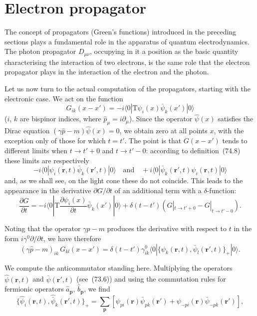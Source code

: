 \section{Electron propagator}

The concept of propagators (Green's functions) introduced in the preceding sections plays a fundamental role in the apparatus of quantum electrodynamics. The photon propagator $D_{\mu\nu}$, occupying in it a position as the basic quantity characterising the interaction of two electrons, is the same role that the electron propagator plays in the interaction of the electron and the photon.

Let us now turn to the actual computation of the propagators, starting with the electronic case. We act on the function
\begin{equation}
G_{ik}(x - x') = -i\langle 0|\mathrm{T}\psi_i(x)\bar{\psi}_k(x')|0\rangle
\tag{75.1}
\label{eq:75.1}
\end{equation}
($i$, $k$ are bispinor indices, where $\hat{p}_\mu = i\partial_\mu$). Since the operator $\hat{\psi}(x)$ satisfies the Dirac equation $(\gamma\hat{p} - m)\hat{\psi}(x) = 0$, we obtain zero at all points $x$, with the exception only of those for which $t = t'$. The point is that $G(x - x')$ tends to different limits when $t \to t' + 0$ and $t \to t' - 0$: according to definition~(74.8) these limits are respectively
\[
-i\langle 0|\psi_i(\mathbf{r},t)\bar{\psi}_k(\mathbf{r}',t)|0\rangle\quad\text{and}\quad +i\langle 0|\bar{\psi}_k(\mathbf{r}',t)\psi_i(\mathbf{r},t)|0\rangle
\]
and, as we shall see, on the light cone these do not coincide. This leads to the appearance in the derivative $\partial G/\partial t$ of an additional term with a $\delta$-function:
\begin{equation}
\frac{\partial G}{\partial t} = -i\langle 0|\mathrm{T}\frac{\partial\psi_i(x)}{\partial t}\bar{\psi}_k(x')|0\rangle + \delta(t - t')(G|_{t\to t'+0} - G|_{t\to t'-0}).
\tag{75.2}
\end{equation}

Noting that the operator $\gamma\hat{p} - m$ produces the derivative with respect to $t$ in the form $i\gamma^0\partial/\partial t$, we have therefore
\begin{equation}
(\gamma\hat{p} - m)_{ik}\,G_{kl}(x - x') = \delta(t - t')\gamma^0_{ik}\langle 0|\{\psi_k(\mathbf{r},t),\bar{\psi}_l(\mathbf{r}',t)\}_+|0\rangle.
\tag{75.3}
\end{equation}

We compute the anticommutator standing here. Multiplying the operators $\hat{\psi}(\mathbf{r},t)$ and $\hat{\bar{\psi}}(\mathbf{r}',t)$ (see~(73.6)) and using the commutation rules for fermionic operators $\hat{a}_\mathbf{p}$, $\hat{b}_\mathbf{p}$, we find
\begin{equation}
\{\hat{\psi}_i(\mathbf{r},t),\hat{\bar{\psi}}_k(\mathbf{r}',t)\}_+ = \sum_\mathbf{p}[\psi_{pi}(\mathbf{r})\bar{\psi}_{pk}(\mathbf{r}') + \psi_{-pi}(\mathbf{r})\bar{\psi}_{-pk}(\mathbf{r}')],
\tag{75.4}
\end{equation}

